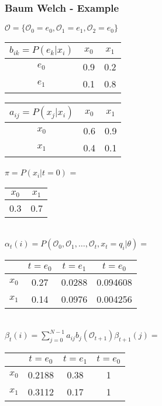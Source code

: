 \begin{frame}
	\frametitle{Baum Welch - Example}
  \begin{table}
  \centering
  $\mathcal{O} = \{\mathcal{O}_0 = e_0, \mathcal{O}_1 = e_1, \mathcal{O}_2 = e_0\}$\\
  \begin{tabular}{| c | c | c |}
  	\hline
    $b_{ik} = P(e_k|x_i)$ & $x_0$ & $x_1$ \\ \hline
    $e_0$                 & 0.9   & 0.2   \\ \hline
    $e_1$                 & 0.1   & 0.8   \\ \hline
  \end{tabular}
  \begin{tabular}{| c | c | c |}
  	\hline
    $a_{ij} = P(x_j|x_i)$ & $x_0$ & $x_1$ \\ \hline
    $x_0$                 & 0.6   & 0.9   \\ \hline
    $x_1$                 & 0.4   & 0.1   \\ \hline
  \end{tabular}
  $\pi = P(x_i|t=0)$ =
  \begin{tabular}{| c | c |}
  	\hline
    $x_0$ & $x_1$ \\ \hline
    0.3   & 0.7   \\ \hline
  \end{tabular}\\  
  $\alpha_t(i) = P(\mathcal{O}_0, \mathcal{O}_1, \dots ,\mathcal{O}_t , x_t = q_i | \theta) =$
  \begin{tabular}{| c | c | c | c |}
  	\hline
          & $t=e_0$ & $t=e_1$ & $t=e_0$ \\ \hline
    $x_0$ & 0.27    & 0.0288  & 0.094608 \\ \hline
    $x_1$ & 0.14    & 0.0976  & 0.004256 \\ \hline
  \end{tabular}\\
  $\beta_t(i) = \sum\limits_{j=0}^{N-1} a_{ij} b_j(\mathcal{O}_{t+1})\beta_{t+1}(j) =$
  \begin{tabular}{| c | c | c | c |}
  	\hline
          & $t=e_0$ & $t=e_1$ & $t=e_0$ \\ \hline
    $x_0$ & 0.2188  & 0.38    & 1       \\ \hline
    $x_1$ & 0.3112  & 0.17    & 1       \\ \hline
  \end{tabular}\\
\end{table}
\end{frame}

